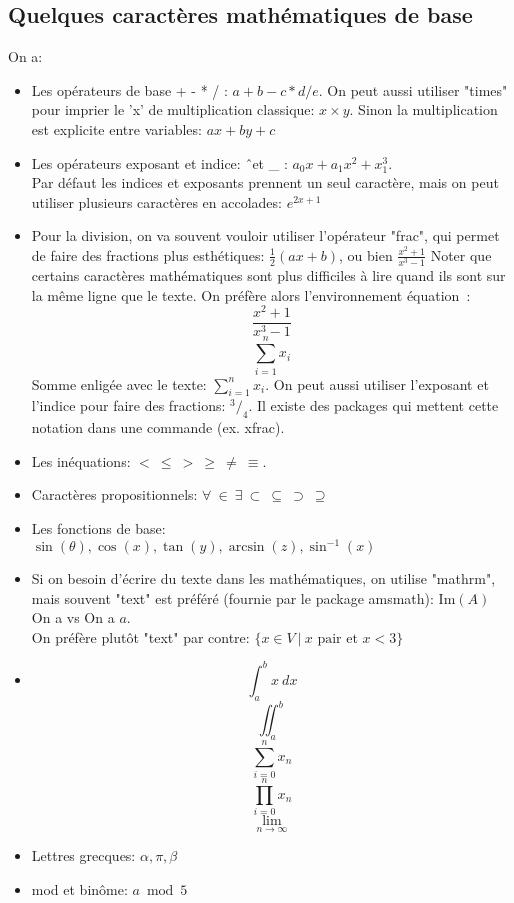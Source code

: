\documentclass[letterpaper, french, 12pt]{article} %
\numberwithin{equation}{section}
\numberwithin{figure}{section}
\begin{document}
\subsection{Quelques caractères mathématiques de base}
On a:
\begin{itemize}
    \item Les opérateurs de base + - * / :
    $a + b - c * d / e$. On peut aussi utiliser
    "times" pour imprier le 'x' de multiplication
    classique: $x \times y$. Sinon la multiplication est explicite entre variables: $ax + by + c$
    \item Les opérateurs exposant et indice: \^\ et \_ : $a_0x + a_1x^2 + x_1^3$.\\
    Par défaut les indices et exposants prennent
    un seul caractère, mais on peut utiliser
    plusieurs caractères en accolades: $e^{2x+1}$
    \item Pour la division, on va souvent vouloir
    utiliser l'opérateur "frac", qui permet de faire des fractions plus esthétiques:
    $\frac{1}{2}(ax + b)$, ou bien $\frac{x^2 + 1}{x^3 - 1}$
    Noter que certains caractères mathématiques sont plus difficiles à lire quand ils sont
    sur la même ligne que le texte. On préfère alors l'environnement équation~:
    \begin{equation}
        \frac{x^2 + 1}{x^3 - 1}
    \end{equation}
    \begin{equation}
        \sum_{i=1}^{n}x_i
    \end{equation}
    Somme enligée avec le texte: $\sum_{i=1}^{n}x_i$.
    On peut aussi utiliser l'exposant et l'indice
    pour faire des fractions: $^3/_4$. Il existe 
    des packages qui mettent cette notation dans une commande (ex. xfrac).
    \item Les inéquations: $< \ \leq \ > \ \geq \  \neq \ \equiv$.
    \item Caractères propositionnels: $\forall \ \in \ \exists \ \subset \ \subseteq \ \supset \ \supseteq$
    \item Les fonctions de base: $\sin(\theta), \cos(x), \tan(y), \arcsin(z), \sin^{-1}(x)$
    \item Si on besoin d'écrire du texte dans les mathématiques, on utilise "mathrm", mais souvent "text" est préféré (fournie par le package amsmath): $\mathrm{Im}(A)$ On a vs On a $a$.
    \\ On préfère plutôt "text"
    par contre: $\{x \in V \ | \ x \text{ pair et } x < 3 \}$
    \item \[\int_a^b x \ dx\]
    \[\iint_a^b\]
    \[ \sum_{i=0}^n x_n \]
    \[  \prod_{i=0}^n x_n \]
    \[ \lim_{n \rightarrow \infty} \]
    \item Lettres grecques: $\alpha, \pi, \beta$
    \item mod et binôme: $a \bmod 5$
\end{itemize}
\end{document}
